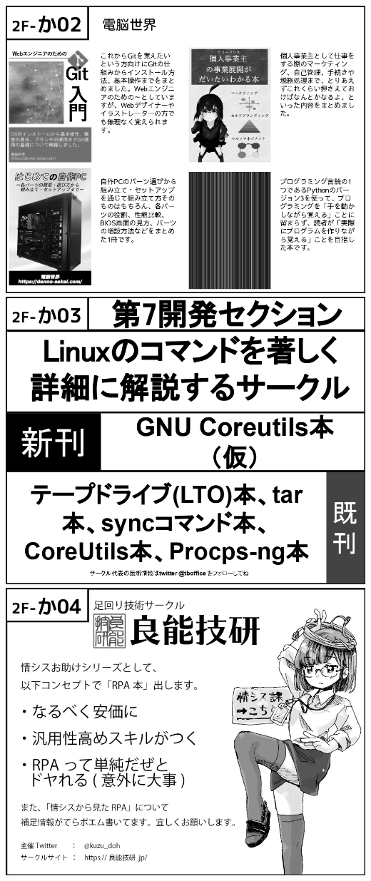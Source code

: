 \begin{center}
\includegraphics[width=0.9\linewidth]{images/circle-appeals/2F-か02.jpg}
\includegraphics[width=0.9\linewidth]{images/circle-appeals/2F-か03.jpg}
\includegraphics[width=0.9\linewidth]{images/circle-appeals/2F-か04.jpg}

\end{center}
